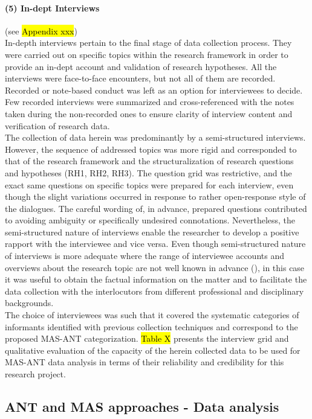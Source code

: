 \documentclass[11pt]{report}
\begin{document}
\paragraph{(5) In-dept Interviews}
(see \hl{Appendix xxx})
\\
In-depth interviews pertain to the final stage of data collection process. They were carried out on specific topics within the research framework in order to provide an in-dept account and validation of research hypotheses. All the interviews were face-to-face encounters, but not all of them are recorded. Recorded or note-based conduct was left as an option for interviewees to decide. Few recorded interviews were summarized and cross-referenced with the notes taken during the non-recorded ones to ensure clarity of interview content and verification of research data.
\\
The collection of data herein was predominantly by a semi-structured interviews. However, the sequence of addressed topics was more rigid and corresponded to that of the research framework and the structuralization of research questions and hypotheses (RH1, RH2, RH3). The question grid was restrictive, and the exact same questions on specific topics were prepared for each interview, even though the slight variations occurred in response to rather open-response style of the dialogues. The careful wording of, in advance, prepared questions contributed to avoiding ambiguity or specifically undesired connotations. Nevertheless, the semi-structured nature of interviews enable the researcher to develop a positive rapport with the interviewee and vice versa. Even though semi-structured nature of interviews is more adequate where the range of interviewee accounts and overviews about the research topic are not well known in advance (\cite{King 1994}), in this case it was useful to obtain the factual  information on the matter and to facilitate the data collection with the interlocutors from different professional and disciplinary backgrounds. 
\\
The choice of interviewees was such that it covered the systematic categories of informants identified with previous collection techniques and correspond to the proposed MAS-ANT categorization. \hl{Table X} presents the interview grid and qualitative evaluation of the capacity of the herein collected data to be used for MAS-ANT data analysis in terms of their reliability and credibility for this research project.

\subsection{ANT and MAS approaches - Data analysis}
\end{document}
